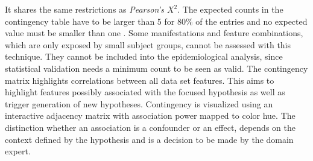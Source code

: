 \documentclass[journal]{style/vgtc} 			          %
\begin{document}
It shares the same restrictions as \emph{Pearson's $X^2$}.
%
The expected counts in the contingency table have to be larger than 5 for $80\%$ of the entries and no expected value must be smaller than one \cite{Cochran1952}.
%
Some manifestations and feature combinations, which are only exposed by small subject groups, cannot be assessed with this technique.
%
They cannot be included into the epidemiological analysis, since statistical validation needs a minimum count to be seen as valid.
The contingency matrix highlights correlations between all data set features. %
%
This aims to highlight features possibly associated with the focused hypothesis as well as trigger generation of new hypotheses.
%
Contingency is visualized using an interactive adjacency matrix with association power mapped to color hue.
%
The distinction whether an association is a confounder or an effect, depends on the context defined by the hypothesis and is a decision to be made by the domain expert.
% 
\end{document}
